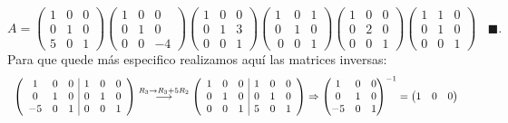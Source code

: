 \documentclass[11pt,letterpaper]{article}
\newcommand{\finf}{\blacksquare.}
\newcommand{\grstep}[2][\relax]{%
   \ensuremath{\mathrel{
       {\mathop{\longrightarrow}\limits^{#2\mathstrut}_{
                                     \begin{subarray}{l} #1 \end{subarray}}}}}}
\begin{document}
\begin{enumerate}
\begin{equation*}
A=\begin{pmatrix}
 1 & 0 & 0\\
 0 & 1 & 0\\
 5 & 0 & 1
\end{pmatrix}
\begin{pmatrix}
 1 & 0 & 0\\
 0 & 1 & 0\\
 0 & 0 & -4
\end{pmatrix}
\begin{pmatrix}
 1 & 0 & 0\\
 0 & 1 & 3\\
 0 & 0 & 1
\end{pmatrix}
\begin{pmatrix}
 1 & 0 & 1\\
 0 & 1 & 0\\\
 0 & 0 & 1
\end{pmatrix}
\begin{pmatrix}
 1 & 0 & 0\\
 0 & 2 & 0\\
 0 & 0 & 1
\end{pmatrix}
\begin{pmatrix}
 1 & 1 & 0\\
 0 & 1 & 0\\
 0 & 0 & 1
\end{pmatrix}\ \ \ \ \finf
\end{equation*}
Para que quede más especifico realizamos aquí las matrices inversas:
\begin{equation*}
\begin{array}{c}
 \left( \begin{array}{ccc|ccc}
 1 & 0 & 0 & 1 & 0 & 0\\
 0 & 1 & 0 & 0 & 1 & 0 \\
-5 & 0 & 1 & 0 & 0 & 1
\end{array} \right)%
\grstep[]{R_3 \rightarrow R_3+5R_2}
%
\left( \begin{array}{ccc|ccc}
 1 & 0 & 0 & 1 & 0 & 0\\
 0 & 1 & 0 & 0 & 1 & 0 \\
 0 & 0 & 1 & 5 & 0 & 1
\end{array} \right)\Rightarrow \begin{pmatrix}
 1 & 0 & 0\\
 0 & 1 & 0\\
-5 & 0 & 1
\end{pmatrix}^{-1}=\begin{pmatrix}
 1 & 0 & 0\\

\end{pmatrix}
\end{array}
\end{equation*}
\end{enumerate}
\end{document}
